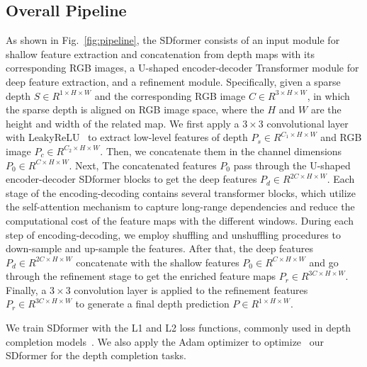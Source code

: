 \documentclass[conference]{IEEEtran}
\begin{document}
\subsection{Overall Pipeline}
As shown in Fig.~\ref{fig:pipeline}, the SDformer consists of an input module for shallow feature extraction and concatenation from depth maps with its corresponding RGB images, a U-shaped encoder-decoder Transformer module for deep feature extraction, and a refinement module. 
Specifically,
given a sparse depth $ S \in R^ {1 \times H \times W} $ and the corresponding RGB image $ C \in R^ { 3 \times H \times W}  $, in which the sparse depth is aligned on RGB image space, where the $H$ and $W$ are the height and width of the related map.
We first apply a $3\times3$ convolutional layer with LeakyReLU~\cite{b16} to extract low-level features of depth $ P_s \in R^{ {C_1} \times H \times W }$ and RGB image $ P_c \in R^{ {C_2} \times H \times W}$.
Then, we concatenate them in the channel dimensions $ P_0 \in R^{ C \times H \times W } $.
Next, The concatenated features $P_0$ pass through the U-shaped encoder-decoder SDformer blocks to get the deep features $ P_d \in R^{ 2C \times H \times W} $.
Each stage of the encoding-decoding contains several transformer blocks, which utilize the self-attention mechanism to capture long-range dependencies and reduce the computational cost of the feature maps with the different windows. 
During each step of encoding-decoding, we employ shuffling and unshuffling procedures to down-sample and up-sample the features.
After that, the deep features $ P_d \in R^{ 2C \times H \times W} $  concatenate with the shallow features $ P_0 \in R^{ C \times H \times W } $ and go through the refinement stage to get the enriched feature maps $ P_r \in R^ {3C \times H \times W} $.  
Finally, a $3\times3$ convolution layer is applied to the refinement features $ P_r \in R^ {3C \times H \times W} $ to generate a final depth prediction $ P \in R ^{1 \times H \times W} $.

We train SDformer with the L1 and L2 loss functions, commonly used in depth completion models~\cite{b17,b18,b19,b20,b21}. We also apply the Adam optimizer to optimize~\cite{b22} our SDformer for the depth completion tasks.
\end{document}
